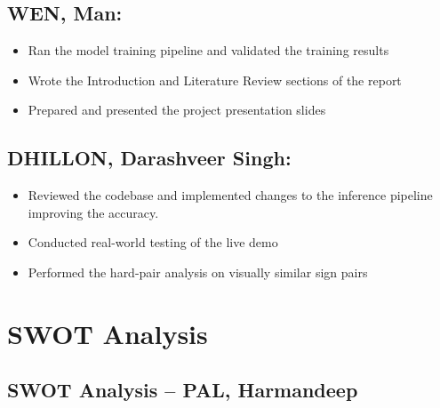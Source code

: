 \documentclass[conference]{IEEEtran}
\begin{document}
\subsection{WEN, Man:}
\begin{itemize}
  \item Ran the model training pipeline and validated the training results
  \item Wrote the Introduction and Literature Review sections of the report
  \item Prepared and presented the project presentation slides
\end{itemize}

\subsection{DHILLON, Darashveer Singh:}
\begin{itemize}
  \item Reviewed the codebase and implemented changes to the inference pipeline improving the accuracy.
  \item Conducted real-world testing of the live demo
  \item Performed the hard-pair analysis on visually similar sign pairs
\end{itemize}

\section{SWOT Analysis}
\label{app:swot}

\subsection{SWOT Analysis -- PAL, Harmandeep}
\end{document}
